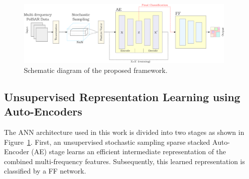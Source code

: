 

%
%
%
%
%





\begin{figure}[tbp] 
	\centering
	\includegraphics[width=0.95\textwidth]{Figures/Kron/AE}
	\caption{Schematic diagram of the proposed framework.}
	\label{fig:ANN}
\end{figure}

\subsection[Unsupervised Representation Learning using Auto-Encoders]{Unsupervised Representation Learning using \\ Auto-Encoders}

\label{sec:ANN}
The ANN architecture used in this work is divided into two stages as shown in Figure~\ref{fig:ANN}. 
First, an unsupervised stochastic sampling sparse stacked Auto-Encoder (AE) stage learns an efficient intermediate representation of the combined multi-frequency features. Subsequently, this learned representation is classified by a FF network. 

